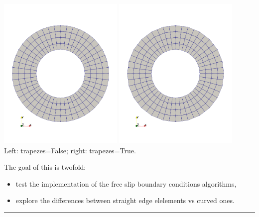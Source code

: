 \begin{center}
\includegraphics[width=6cm]{./python_codes/fieldstone_151/images/mesh1}
\includegraphics[width=6cm]{./python_codes/fieldstone_151/images/mesh2}\\
{\captionfont Left: {\python trapezes=False}; right:   {\python trapezes=True}.}
\end{center}

The goal of this \stone is twofold:
\begin{itemize}
\item test the implementation of the free slip boundary conditions algorithms,
\item explore the differences between straight edge elelements vs curved ones.
\end{itemize}



\par\noindent\rule{\textwidth}{0.4pt}

\vspace{.5cm}


